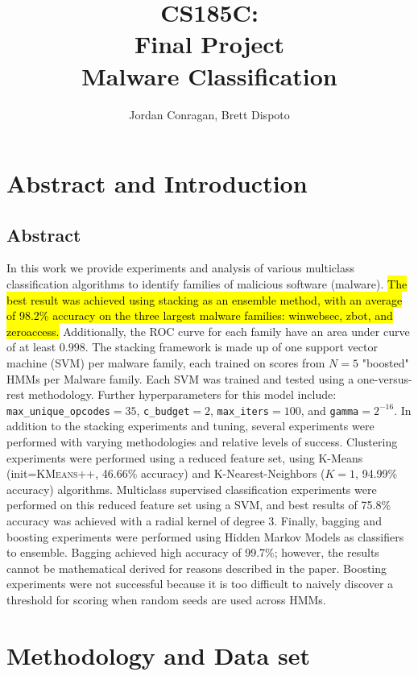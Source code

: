 \documentclass[12pt]{article}
\title{CS185C: \\ 
Final Project \\
Malware Classification}
\author{Jordan Conragan,  Brett Dispoto}
\begin{document}
\maketitle
\tableofcontents
\newpage

\section{Abstract and Introduction}
\subsection{Abstract}
In this work we provide experiments and analysis of various multiclass classification algorithms to identify families of malicious software (malware). \hl{The best result was achieved using stacking as an ensemble method, with an average of 98.2\% accuracy on the three largest malware families:  winwebsec, zbot, and zeroaccess.} Additionally, the ROC curve for each family have an area under curve of at least $0.998$. The stacking framework is made up of one support vector machine (SVM) per malware family, each trained on scores from $N=5$ "boosted" HMMs per Malware family. Each SVM was trained and tested using a one-versus-rest methodology. Further hyperparameters for this model include: \texttt{max\_unique\_opcodes}$=35$, \texttt{c\_budget}$=2$, \texttt{max\_iters}$=100$, and \texttt{gamma}$=2^{-16}$. In addition to the stacking experiments and tuning, several experiments were performed with varying methodologies and relative levels of success. Clustering experiments were performed using a reduced feature set, using K-Means  (init=\textsc{KMeans++}, 46.66\% accuracy) and K-Nearest-Neighbors ($K=1$, 94.99\% accuracy) algorithms. Multiclass supervised classification experiments were performed on this reduced feature set using a SVM, and best results of 75.8\% accuracy was achieved with a radial kernel of degree 3. Finally, bagging and boosting experiments were performed using Hidden Markov Models as classifiers to ensemble. Bagging achieved high accuracy of 99.7\%; however, the results cannot be mathematical derived for reasons described in the paper. Boosting experiments were not successful because it is too difficult to naively discover a threshold for scoring when random seeds are used across HMMs.
\section{Methodology and Data set}
\end{document}

